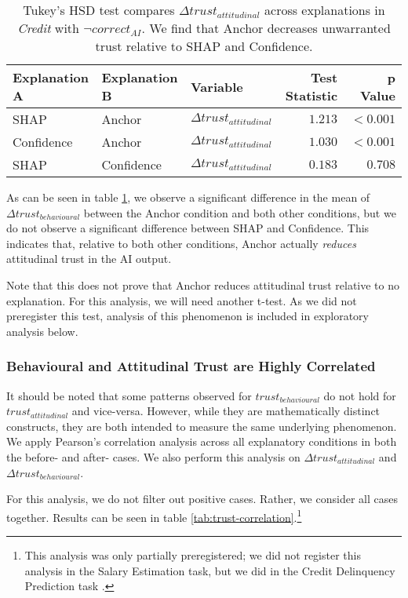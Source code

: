 \begin{table}[htb]
    \centering
    \caption{Tukey's HSD test compares $\Delta trust_{attitudinal}$ across explanations in \emph{Credit} with $\neg correct_{AI}$. We find that Anchor decreases unwarranted trust relative to SHAP and Confidence.}
    \label{tab:delta-trust-hsd-2}
    \begin{tabular}{lllrr}
        \toprule
        Explanation A & Explanation B & Variable & Test Statistic & p Value \\
        \midrule
        SHAP & Anchor & $\Delta trust_{attitudinal}$ & $\mathbf{1.213}$ & $\mathbf{<0.001}$ \\
        Confidence & Anchor & $\Delta trust_{attitudinal}$ & $\mathbf{1.030}$ & $\mathbf{<0.001}$ \\
        SHAP & Confidence & $\Delta trust_{attitudinal}$ & $0.183$ & $0.708$ \\
        \bottomrule
    \end{tabular}
\end{table}

As can be seen in table \ref{tab:delta-trust-hsd-2}, we observe a significant difference in the mean of $\Delta trust_{behavioural}$ between the Anchor condition and both other conditions, but we do not observe a significant difference between SHAP and Confidence. This indicates that, relative to both other conditions, Anchor actually \emph{reduces} attitudinal trust in the AI output.

Note that this does not prove that Anchor reduces attitudinal trust relative to no explanation. For this analysis, we will need another t-test. As we did not preregister this test, analysis of this phenomenon is included in exploratory analysis below.

\subsubsection{Behavioural and Attitudinal Trust are Highly Correlated}
It should be noted that some patterns observed for $trust_{behavioural}$ do not hold for $trust_{attitudinal}$ and vice-versa. However, while they are mathematically distinct constructs, they are both intended to measure the same underlying phenomenon. We apply Pearson's correlation analysis across all explanatory conditions in both the before- and after- cases. We also perform this analysis on $\Delta trust_{attitudinal}$ and $\Delta trust_{behavioural}$. 

For this analysis, we do not filter out positive cases. Rather, we consider all cases together. Results can be seen in table \ref{tab:trust-correlation}.\footnote{This analysis was only partially preregistered; we did not register this analysis in the Salary Estimation task, but we did in the Credit Delinquency Prediction task \cite{natarajan_binns_2022}.}

